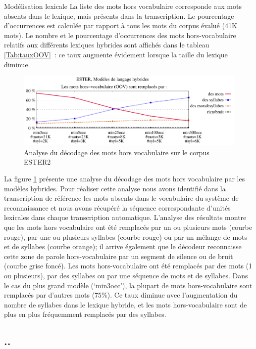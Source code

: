 \documentclass{style/these}
\newcommand{\hiddensubsection}[1]{
    \stepcounter{subsection}
    \subsection*{\arabic{chapter}.\arabic{section}.\arabic{subsection}\hspace{1em}{#1}}
}
\begin{document}
\begin{part}{Modélisation lexicale}
La liste des mots hors vocabulaire corresponde aux mots absents dans le lexique, mais présents dans la transcription. 
Le pourcentage d'occurrences est calculée par rapport à tous les mots du corpus évalué (41K mots).
Le nombre et le pourcentage d'occurrences des mots hors-vocabulaire relatifs aux différents lexiques hybrides sont affichés dans le tableau \ref{Tab:tauxOOV}~: ce taux augmente évidement lorsque la taille du lexique diminue.

\begin{figure}[h!]
\centering
\includegraphics[scale=0.62]{images/results/ESTER_OOV_sv.pdf}
\caption{Analyse du décodage des mots hors vocabulaire sur le corpus ESTER2}
\label{Fig:OOV-ESTER}
\end{figure}


La figure \ref{Fig:OOV-ESTER} présente une analyse du décodage des mots hors vocabulaire par les modèles hybrides. 
Pour réaliser cette analyse nous avons identifié dans la transcription de référence les mots absents dans le vocabulaire du système de reconnaissance et nous avons récupéré la séquence correspondante d'unités lexicales dans chaque transcription automatique. L'analyse des résultats montre que les mots hors vocabulaire ont été remplacés par un ou plusieurs mots (courbe rouge), par une ou plusieurs syllabes (courbe rouge) ou par un mélange de mots et de syllabes (courbe orange); il arrive également que le décodeur reconnaisse cette zone de parole hors-vocabulaire par un segment de silence ou de bruit (courbe grise foncé). 
Les mots hors-vocabulaire ont été remplacés par des mots (1 ou plusieurs), par des syllabes ou par une séquence de mots et de syllabes. 
Dans le cas du plus grand modèle (`min3occ'), la plupart de mots hors-vocabulaire sont remplacés par d'autres mots (75\%). 
Ce taux diminue avec l'augmentation  du nombre de syllabes dans le lexique hybride, et les mots hors-vocabulaire sont de plus en plus fréquemment remplacés par des syllabes. 




\hiddensubsection{Mesures de confiance}


\end{part}
\end{document}
